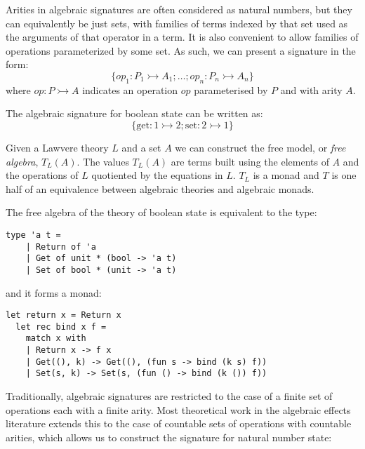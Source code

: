 \documentclass[acmsmall, screen, nonacm]{acmart}
\theoremstyle{definition}
\newcommand{\types}{\mathrel{:}}
\begin{document}
Arities in algebraic signatures are often considered as natural numbers,
but they can equivalently be just sets, with families of terms indexed
by that set used as the arguments of that operator in a term. It is also
convenient to allow families of operations parameterized by some set. As
such, we can present a signature in the form:
\begin{equation*}
\{ op_1 \types P_1 \rightarrowtail A_1; \ldots; op_n
\types P_n \rightarrowtail A_n \}
\end{equation*}
where $op \types P \rightarrowtail A$ indicates an operation $op$
parameterised by $P$ and with arity $A$.

\begin{example}
  The algebraic signature for boolean state can be written as:
  \begin{equation*}
    \{ \mathrm{get} \types 1 \rightarrowtail 2; \mathrm{set} \types 2 \rightarrowtail 1 \}
  \end{equation*}
\end{example}

Given a Lawvere theory $L$ and a set $A$ we can construct the free
model, or \emph{free algebra}, $T_L(A)$. The values $T_L(A)$ are terms
built using the elements of $A$ and the operations of $L$ quotiented by
the equations in $L$. $T_L$ is a monad and $T$ is one half of an
equivalence between algebraic theories and algebraic monads.

\begin{example}
  The free algebra of the theory of boolean state is equivalent
  to the type:
  \begin{lstlisting}[style=oxcaml]
  type 'a t =
    | Return of 'a
    | Get of unit * (bool -> 'a t)
    | Set of bool * (unit -> 'a t)
  \end{lstlisting}
  and it forms a monad:
  \begin{lstlisting}[style=oxcaml]
  let return x = Return x
  let rec bind x f =
    match x with
    | Return x -> f x
    | Get((), k) -> Get((), (fun s -> bind (k s) f))
    | Set(s, k) -> Set(s, (fun () -> bind (k ()) f))
  \end{lstlisting}  
\end{example}

Traditionally, algebraic signatures are restricted to the case of a
finite set of operations each with a finite arity. Most theoretical work
in the algebraic effects literature extends this to the case of
countable sets of operations with countable arities, which allows us to
construct the signature for natural number state:
\end{document}
